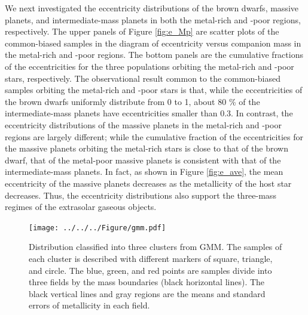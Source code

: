 \documentclass[twocolumn, dvipdfmx]{aastex62}
\begin{document}
\begin{CJK*}{UTF8}{min}
We next investigated the eccentricity distributions of the brown dwarfs, massive planets, and intermediate-mass planets in both the metal-rich and -poor regions, respectively. The upper panels of Figure \ref{fig:e_Mp} are scatter plots of the common-biased samples in the diagram of eccentricity versus companion mass in the metal-rich and -poor regions. The bottom panels are the cumulative fractions of the eccentricities for the three populations orbiting the metal-rich and -poor stars, respectively. The observational result common to the common-biased samples orbiting the metal-rich and -poor stars is that, while the eccentricities of the brown dwarfs uniformly distribute from 0 to 1, about 80 \% of the intermediate-mass planets have eccentricities smaller than 0.3. In contrast, the eccentricity distributions of the massive planets in the metal-rich and -poor regions are largely different; while the cumulative fraction of the eccentricities for the massive planets orbiting the metal-rich stars is close to that of the brown dwarf, that of the metal-poor massive planets is consistent with that of the intermediate-mass planets. In fact, as shown in Figure \ref{fig:e_ave}, the mean eccentricity of the massive planets decreases as the metallicity of the host star decreases. Thus, the eccentricity distributions also support the three-mass regimes of the extrasolar gaseous objects.

\begin{figure}[t]
\begin{center}
\texttt{[image: ../../../Figure/gmm.pdf]}
\caption{Distribution classified into three clusters from GMM. The samples of each cluster is described with different markers of square, triangle, and circle. The blue, green, and red points are samples divide into three fields by the mass boundaries (black horizontal lines). The black vertical lines and gray regions are the means and standard errors of metallicity in each field. \label{fig:gmm}}
\end{center}
\end{figure}


\end{CJK*}
\end{document}
